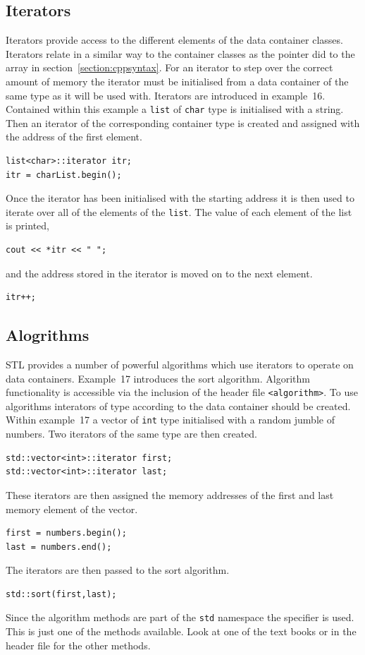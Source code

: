 \documentclass[11pt,a4paper]{scrartcl}
\begin{document}

\subsection{Iterators}
Iterators provide access to the different elements of the data
container classes.  Iterators relate in a similar way to the container
classes as the pointer did to the array in
section~\ref{section:cppsyntax}.  For an iterator to step over the
correct amount of memory the iterator must be initialised from a data
container of the same type as it will be used with.  Iterators are
introduced in example~16.  Contained within this example a
\texttt{list} of \texttt{char} type is initialised with a string.
Then an iterator of the corresponding container type is created and
assigned with the address of the first element.
\begin{verbatim}
list<char>::iterator itr;
itr = charList.begin();
\end{verbatim}
Once the iterator has been initialised with the starting address it is
then used to iterate over all of the elements of the \texttt{list}.
The value of each element of the list is printed,
\begin{verbatim}
cout << *itr << " ";
\end{verbatim}
and the address stored in the iterator is moved on to the next element.
\begin{verbatim}
itr++;
\end{verbatim}


\subsection{Alogrithms}
STL provides a number of powerful algorithms which use iterators to
operate on data containers.  Example~17 introduces the sort algorithm.
Algorithm functionality is accessible via the inclusion of the header
file \texttt{<algorithm>}.  To use algorithms interators of type
according to the data container should be created.  Within example~17 a
vector of \texttt{int} type initialised with a random jumble of
numbers.  Two iterators of the same type are then created.
\begin{verbatim}
std::vector<int>::iterator first;
std::vector<int>::iterator last;
\end{verbatim}
These iterators are then assigned the memory addresses of the first and
last memory element of the vector.
\begin{verbatim}
first = numbers.begin();
last = numbers.end();
\end{verbatim}
The iterators are then passed to the sort algorithm.
\begin{verbatim}
std::sort(first,last);
\end{verbatim}
Since the algorithm methods are part of the \texttt{std} namespace the
specifier is used.  This is just one of the methods available.  Look
at one of the text books or in the header file for the other methods.
\end{document}
